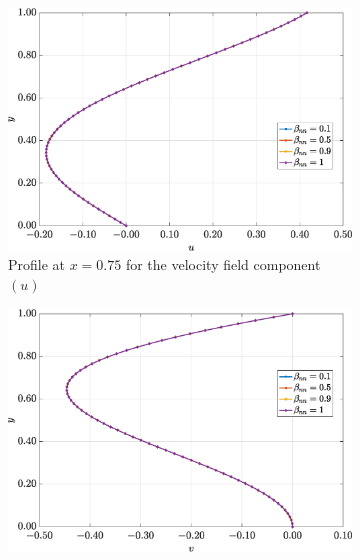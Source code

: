 \documentclass[preprint, 12pt]{elsarticle}
\begin{document}
\begin{figure}[H]
    \centering
    \begin{subfigure}[b]{.46\textwidth}
        \includegraphics[width=\textwidth]{Slice_x_Tog_Numerical_NormErr_2nd_Betann_1_Re_1000_Wi_1_epsilon_0_xi_0_alphaG_0.5_Dt_1e-06_at_0.05_tipsim_1_MMS_12_x0.75y0.75_U.eps}
        \caption{Profile at $x=0.75$ for the velocity field component $(u)$}
        \label{fig_slice_y_u_2nd_Case1_giesekus_x075}
    \end{subfigure}
    \vspace{0.2cm}
    \qquad
    \begin{subfigure}[b]{.46\textwidth}
        \includegraphics[width=\textwidth]{Slice_x_Tog_Numerical_NormErr_2nd_Betann_1_Re_1000_Wi_1_epsilon_0_xi_0_alphaG_0.5_Dt_1e-06_at_0.05_tipsim_1_MMS_12_x0.75y0.75_V.eps}

\end{subfigure}
\end{figure}
\end{document}
